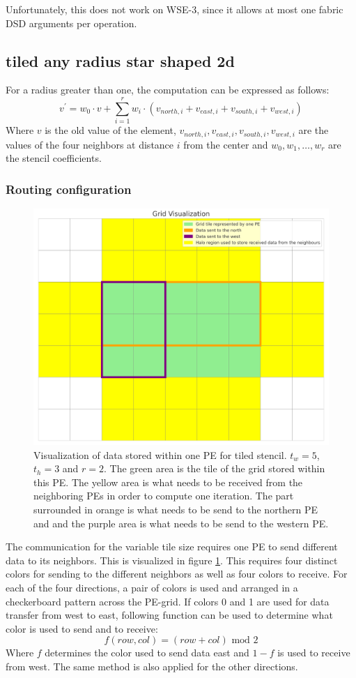 \documentclass{article}
\newcommand{\m}{\text{ mod }}
\begin{document}
Unfortunately, this does not work on WSE-3, since it allows at most one fabric DSD arguments per operation.

\subsection{tiled any radius star shaped 2d}
For a radius greater than one, the computation can be expressed as follows:
\begin{equation}
    \label{eq:stencil_computation_tiled}
    v^{'} = w_0 \cdot v + \sum_{i=1}^{r} w_i \cdot (v_{north,i} + v_{east,i} + v_{south,i} + v_{west,i})
\end{equation}
Where $v$ is the old value of the element, $v_{north,i}, v_{east,i}, v_{south,i}, v_{west,i}$ are the values of the four neighbors at distance $i$ from the center and $w_0, w_1, \dots, w_r$ are the stencil coefficients.
\subsubsection{Routing configuration}
\begin{figure}
    \centering
    \includegraphics[width=0.5\linewidth]{plots/grid_visualization.png}
    \caption{Visualization of data stored within one PE for tiled stencil. $t_w=5$, $t_h=3$ and $r=2$. The green area is the tile of the grid stored within this PE. The yellow area is what needs to be received from the neighboring PEs in order to compute one iteration. The part surrounded in orange is what needs to be send to the northern PE and and the purple area is what needs to be send to the western PE.}
    \label{fig:grid_visualization}
\end{figure}
The communication for the variable tile size requires one PE to send different data to its neighbors. This is visualized in figure \ref{fig:grid_visualization}. This requires four distinct colors for sending to the different neighbors as well as four colors to receive. For each of the four directions, a pair of colors is used and arranged in a checkerboard pattern across the PE-grid.
If colors 0 and 1 are used for data transfer from west to east, following function can be used to determine what color is used to send and to receive:
\begin{equation}
    \label{eq:tiled_coloring_function}
    f(row, col)=(row+col)\m2
\end{equation}
Where $f$ determines the color used to send data east and $1-f$ is used to receive from west. The same method is also applied for the other directions.
\end{document}
